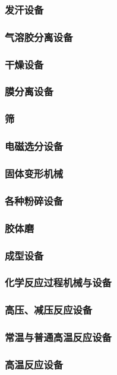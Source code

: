 \documentclass[UTF8]{../../ApplicationUniverse}
\begin{document}
        \subsubsection{发汗设备}
            \subsubsection{气溶胶分离设备}
            \subsubsection{干燥设备}
            \subsubsection{膜分离设备}
            \subsubsection{筛}
            \subsubsection{电磁选分设备}
    \subsubsection{固体变形机械}
        \subsubsection{各种粉碎设备}
        \subsubsection{胶体磨}
        \subsubsection{成型设备}
\subsubsection{化学反应过程机械与设备}
    \subsubsection{高压、减压反应设备}
    \subsubsection{常温与普通高温反应设备}
    \subsubsection{高温反应设备}
\end{document}
